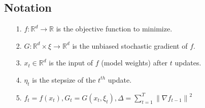 \documentclass[14pt,onecolumn,letterpaper]{extarticle}
\begin{document}
\subsection{Notation}
\begin{enumerate}
    \item [1.] $f:\mathbb{R}^d \rightarrow \mathbb{R}$ is the objective function to minimize.
    \item [2.] $G:\mathbb{R}^d \times \xi \rightarrow \mathbb{R}^d$ is the unbiased stochastic gradient of $f$.
    \item [3.] $x_t\in \mathbb{R}^d$ is the input of $f$ (model weights) after $t$ updates.
    \item [4.] $\eta_t$ is the stepsize of the $t^{th}$ update.
    \item [5.] $f_t=f(x_t),G_t=G(x_t,\xi_t),\Delta=\sum_{t=1}^T\left\|\nabla f_{t-1}\right\|^2$
\end{enumerate}
\end{document}
